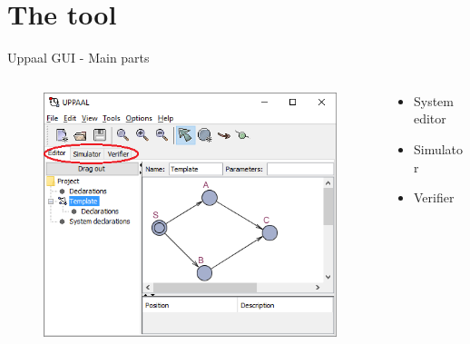 \documentclass{beamer}
\begin{document}
\section{The tool}
\begin{frame}{Uppaal GUI - Main parts}
\vspace{-10mm}
\begin{columns}
	\begin{column}{0.8\textwidth}
		\begin{figure}[H]
			\includegraphics[scale=0.7]{img/uppaal_gui_small_editor.png}
		\end{figure}
	\end{column}
	
	\begin{column}{0.3\textwidth}
		\begin{itemize}
			\item System editor
			\item Simulator
			\item Verifier
		\end{itemize}
	\end{column}
\end{columns}		
\end{frame}
\end{document}
